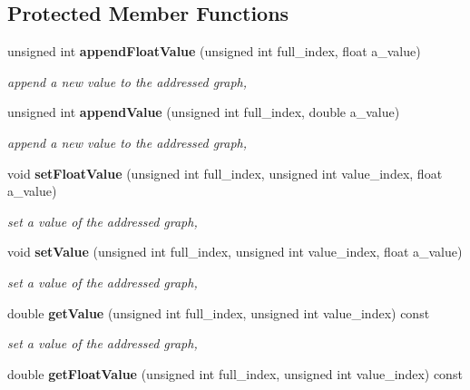 \subsection*{Protected Member Functions}
\begin{DoxyCompactItemize}
\item 
unsigned int {\bf append\-Float\-Value} (unsigned int full\-\_\-index, float a\-\_\-value)\label{classhistmgr_1_1GraphCollection__t_a28fd99da38b507b16d24dff9e7b6b1eb}

\begin{DoxyCompactList}\small\item\em append a new value to the addressed graph, \end{DoxyCompactList}\item 
unsigned int {\bf append\-Value} (unsigned int full\-\_\-index, double a\-\_\-value)\label{classhistmgr_1_1GraphCollection__t_a28ab4fba47b05ef353dd81c76ee4b1b3}

\begin{DoxyCompactList}\small\item\em append a new value to the addressed graph, \end{DoxyCompactList}\item 
void {\bf set\-Float\-Value} (unsigned int full\-\_\-index, unsigned int value\-\_\-index, float a\-\_\-value)\label{classhistmgr_1_1GraphCollection__t_a2768ffebabe6eb28b985a622697d263e}

\begin{DoxyCompactList}\small\item\em set a value of the addressed graph, \end{DoxyCompactList}\item 
void {\bf set\-Value} (unsigned int full\-\_\-index, unsigned int value\-\_\-index, float a\-\_\-value)\label{classhistmgr_1_1GraphCollection__t_afe1fbbf9ce02123a6f0d13af1ccf48ab}

\begin{DoxyCompactList}\small\item\em set a value of the addressed graph, \end{DoxyCompactList}\item 
double {\bf get\-Value} (unsigned int full\-\_\-index, unsigned int value\-\_\-index) const \label{classhistmgr_1_1GraphCollection__t_a85dd0752c73cfdd78909e1e3e7e55cbf}

\begin{DoxyCompactList}\small\item\em set a value of the addressed graph, \end{DoxyCompactList}\item 
double {\bf get\-Float\-Value} (unsigned int full\-\_\-index, unsigned int value\-\_\-index) const \label{classhistmgr_1_1GraphCollection__t_a55ab641e3179a97e4d609deea290eb37}


\end{DoxyCompactItemize}
